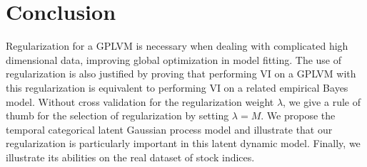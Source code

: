 \documentclass{article}
\begin{document}
\section{Conclusion} \label{sec:C}
Regularization for a GPLVM is necessary when dealing with complicated high dimensional data, improving global optimization in model fitting. The use of regularization is also justified by proving that performing VI on a GPLVM with this regularization is equivalent to performing VI on a related empirical Bayes model. Without cross validation for the regularization weight $\lambda$, we give a rule of thumb for the selection of regularization by setting $\lambda = M$. We propose the temporal categorical latent Gaussian process model and illustrate that our regularization is particularly important in this latent dynamic model. Finally, we illustrate its abilities on the real dataset of stock indices.






















































\newpage
\appendix

\end{document}
